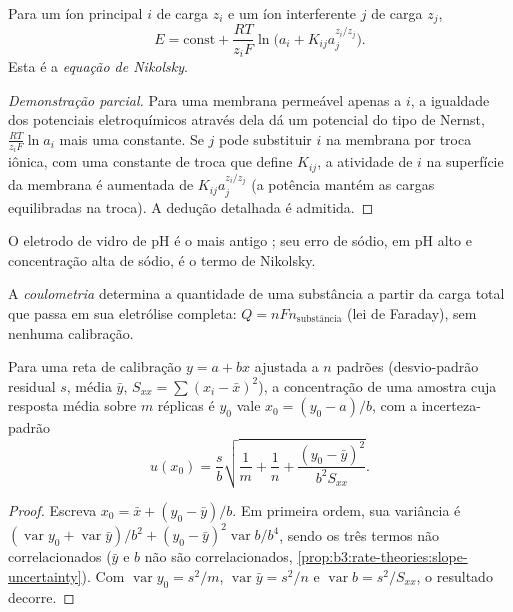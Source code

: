 \begin{proposition}\label{prop:b3:electrode-kinetics:nikolsky}
Para um íon principal $i$ de carga $z_i$ e um íon interferente $j$ de carga $z_j$,
\[
  E = \text{const} + \frac{RT}{z_iF}\ln\bigl(a_i + K_{ij}a_j^{z_i/z_j}\bigr) .
\]
Esta é a \emph{equação de Nikolsky}.
\end{proposition}

\begin{proof}[Demonstração parcial]
Para uma membrana permeável apenas a $i$, a igualdade dos potenciais eletroquímicos
através dela dá um potencial do tipo de Nernst, $\frac{RT}{z_iF}\ln a_i$ mais uma constante.
Se $j$ pode substituir $i$ na membrana por troca iônica, com uma constante de troca
que define $K_{ij}$, a atividade de $i$ na superfície da membrana é aumentada de
$K_{ij}a_j^{z_i/z_j}$ (a potência mantém as cargas equilibradas na troca). A dedução
detalhada é admitida.
\end{proof}

O eletrodo de vidro de pH é o mais antigo ; seu erro de sódio,
em pH alto e concentração alta de sódio, é o termo de Nikolsky.

\begin{definition}[Coulometria]\label{def:b3:electrode-kinetics:coulometry}
A \emph{coulometria} determina a quantidade de uma substância a partir
da carga total que passa em sua eletrólise completa: $Q = nFn_{\text{substância}}$ (lei de
Faraday), sem nenhuma calibração.
\end{definition}

\begin{proposition}\label{prop:b3:electrode-kinetics:inverse-prediction}
Para uma reta de calibração $y = a + bx$ ajustada a $n$ padrões (desvio-padrão
residual $s$, média $\bar y$, $S_{xx} = \sum(x_i - \bar x)^2$), a concentração de uma amostra cuja
resposta média sobre $m$ réplicas é $y_0$ vale $x_0 = (y_0 - a)/b$, com a incerteza-padrão
\[
  u(x_0) = \frac{s}{b}\sqrt{\frac1m + \frac1n + \frac{(y_0 - \bar y)^2}{b^2S_{xx}}} .
\]
\end{proposition}

\begin{proof}
Escreva $x_0 = \bar x + (y_0 - \bar y)/b$. Em primeira ordem, sua variância é $(\operatorname{var}y_0 +
\operatorname{var}\bar y)/b^2 + (y_0 - \bar y)^2\operatorname{var}b/b^4$, sendo os três termos não correlacionados ($\bar y$ e $b$
não são correlacionados, \cref{prop:b3:rate-theories:slope-uncertainty}). Com $\operatorname{var}y_0 =
s^2/m$, $\operatorname{var}\bar y = s^2/n$ e $\operatorname{var}b = s^2/S_{xx}$, o resultado decorre.
\end{proof}

